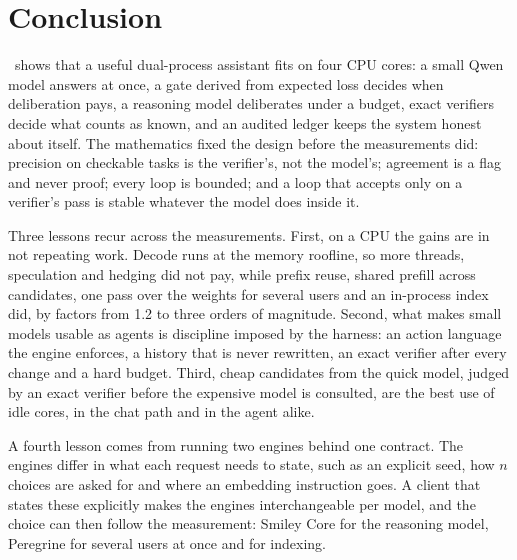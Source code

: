 \section{Conclusion}
\label{sec:conclusion}
\Sys\ shows that a useful dual-process assistant fits on four CPU cores: a
small Qwen model answers at once, a gate derived from expected loss decides
when deliberation pays, a reasoning model deliberates under a budget, exact
verifiers decide what counts as known, and an audited ledger keeps the system
honest about itself. The mathematics fixed the design before the
measurements did: precision on checkable tasks is the verifier's, not the
model's; agreement is a flag and never proof; every loop is bounded; and a
loop that accepts only on a verifier's pass is stable whatever the model
does inside it.

Three lessons recur across the measurements. First, on a CPU the gains are
in not repeating work. Decode runs at the memory roofline, so more threads,
speculation and hedging did not pay, while prefix reuse, shared prefill
across candidates, one pass over the weights for several users and an
in-process index did, by factors from 1.2 to three orders of magnitude.
Second, what makes small models usable as agents is discipline imposed by
the harness: an action language the engine enforces, a history that is never
rewritten, an exact verifier after every change and a hard budget. Third,
cheap candidates from the quick model, judged by an exact verifier before the
expensive model is consulted, are the best use of idle cores, in the chat
path and in the agent alike.

A fourth lesson comes from running two engines behind one contract. The
engines differ in what each request needs to state, such as an explicit
seed, how $n$ choices are asked for and where an embedding instruction goes.
A client that states these explicitly makes the engines interchangeable per
model, and the choice can then follow the measurement: Smiley Core for the
reasoning model, Peregrine for several users at once and for indexing.

